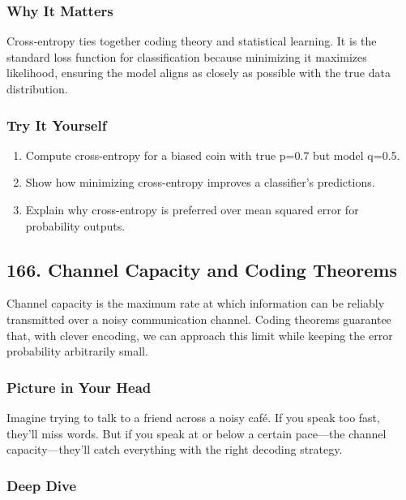 \documentclass[
  letterpaper,
  DIV=11,
  numbers=noendperiod]{scrreprt}
\providecommand{\tightlist}{%
  \setlength{\itemsep}{0pt}\setlength{\parskip}{0pt}}
\begin{document}
\subsubsection{Why It Matters}\label{why-it-matters-62}

Cross-entropy ties together coding theory and statistical learning. It
is the standard loss function for classification because minimizing it
maximizes likelihood, ensuring the model aligns as closely as possible
with the true data distribution.

\subsubsection{Try It Yourself}\label{try-it-yourself-164}

\begin{enumerate}
\def\labelenumi{\arabic{enumi}.}
\tightlist
\item
  Compute cross-entropy for a biased coin with true p=0.7 but model
  q=0.5.
\item
  Show how minimizing cross-entropy improves a classifier's predictions.
\item
  Explain why cross-entropy is preferred over mean squared error for
  probability outputs.
\end{enumerate}

\subsection{166. Channel Capacity and Coding
Theorems}\label{channel-capacity-and-coding-theorems}

Channel capacity is the maximum rate at which information can be
reliably transmitted over a noisy communication channel. Coding theorems
guarantee that, with clever encoding, we can approach this limit while
keeping the error probability arbitrarily small.

\subsubsection{Picture in Your Head}\label{picture-in-your-head-165}

Imagine trying to talk to a friend across a noisy café. If you speak too
fast, they'll miss words. But if you speak at or below a certain
pace---the channel capacity---they'll catch everything with the right
decoding strategy.

\subsubsection{Deep Dive}\label{deep-dive-165}
\end{document}
